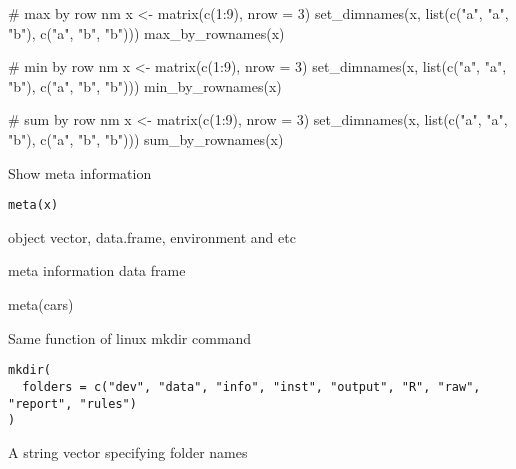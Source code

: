 \documentclass[letterpaper]{book}
\begin{document}
%
\begin{Examples}
\begin{ExampleCode}
# max by row nm
x <- matrix(c(1:9), nrow = 3)
set_dimnames(x, list(c("a", "a", "b"), c("a", "b", "b")))
max_by_rownames(x)

# min by row nm
x <- matrix(c(1:9), nrow = 3)
set_dimnames(x, list(c("a", "a", "b"), c("a", "b", "b")))
min_by_rownames(x)

# sum by row nm
x <- matrix(c(1:9), nrow = 3)
set_dimnames(x, list(c("a", "a", "b"), c("a", "b", "b")))
sum_by_rownames(x)

\end{ExampleCode}
\end{Examples}
%
\begin{Description}
Show meta information
\end{Description}
%
\begin{Usage}
\begin{verbatim}
meta(x)
\end{verbatim}
\end{Usage}
%
\begin{Arguments}
\begin{ldescription}
\item[\code{x}] object vector, data.frame, environment and etc
\end{ldescription}
\end{Arguments}
%
\begin{Value}
meta information data frame
\end{Value}
%
\begin{Examples}
\begin{ExampleCode}
meta(cars)

\end{ExampleCode}
\end{Examples}
%
\begin{Description}
Same function of linux mkdir command
\end{Description}
%
\begin{Usage}
\begin{verbatim}
mkdir(
  folders = c("dev", "data", "info", "inst", "output", "R", "raw", "report", "rules")
)
\end{verbatim}
\end{Usage}
%
\begin{Arguments}
\begin{ldescription}
\item[\code{folders}] A string vector specifying folder names
\end{ldescription}
\end{Arguments}
\end{document}
